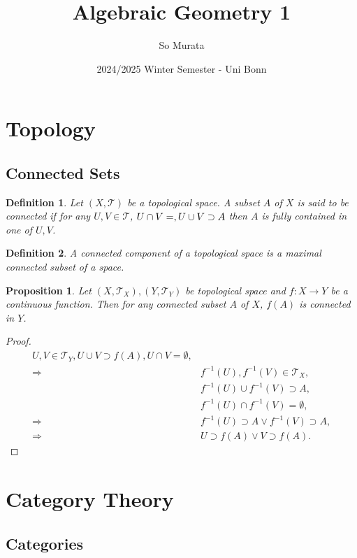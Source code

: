 \documentclass{article}
\title{Algebraic Geometry 1}
\author{So Murata}
\date{2024/2025 Winter Semester - Uni Bonn}
\newtheorem{proposition}{Proposition}[section]
\newtheorem{definition}{Definition}[section]
\numberwithin{equation}{section}
\begin{document}
\maketitle

\section{Topology}

\subsection{Connected Sets}

\begin{definition}
Let $(X,\mathcal{T})$ be a topological space. A subset $A$ of $X$ is said to be connected if for any $U,V\in\mathcal{T}$, $U\cap V=\empty, U\cup V\supset A$ then $A$ is fully contained in one of $U,V$. 
\end{definition}

\begin{definition}
A connected component of a topological space is a maximal connected subset of a space. 
\end{definition}

\begin{proposition}
Let $(X,\mathcal{T}_X),(Y,\mathcal{T}_Y)$ be topological space and $f:X\to Y$ be a continuous function. Then for any connected subset $A$ of $X$, $f(A)$ is connected in $Y$. 
\end{proposition}

\begin{proof}
\begin{align*}
U,V\in\mathcal{T}_Y, U\cup V\supset f(A), U\cap V=\emptyset, \\
 \Rightarrow &f^{-1}(U),f^{-1}(V)\in\mathcal{T}_X,\\
& f^{-1}(U)\cup f^{-1}(V)\supset A, \\
&f^{-1}(U)\cap f^{-1}(V)=\emptyset,\\
 \Rightarrow& f^{-1}(U)\supset A\lor f^{-1}(V)\supset A,\\
 \Rightarrow& U\supset f(A) \lor V\supset f(A).
\end{align*}
\end{proof}


\section{Category Theory}

\subsection{Categories}
\end{document}
